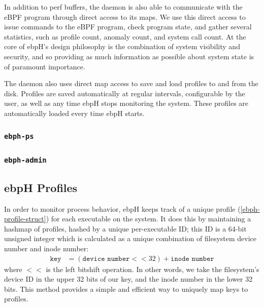 \documentclass[
  12pt]{findlay}
\begin{document}

In addition to perf buffers, the daemon is also able to communicate with
the eBPF program through direct access to its maps. We use this direct
access to issue commands to the eBPF program, check program state, and
gather several statistics, such as profile count, anomaly count, and
system call count. At the core of ebpH's design philosophy is the
combination of system visibility and security, and so providing as much
information as possible about system state is of paramount importance.

The daemon also uses direct map access to save and load profiles to and
from the disk. Profiles are saved automatically at regular intervals,
configurable by the user, as well as any time ebpH stops monitoring the
system. These profiles are automatically loaded every time ebpH starts.

\hypertarget{ebph-ps}{%
\subsubsection{\texorpdfstring{\texttt{ebph-ps}}{ebph-ps}}\label{ebph-ps}}

\hypertarget{ebph-admin}{%
\subsubsection{\texorpdfstring{\texttt{ebph-admin}}{ebph-admin}}\label{ebph-admin}}

\hypertarget{ebph-profiles}{%
\subsection{ebpH Profiles}\label{ebph-profiles}}

\label{ebph_profiles}

In order to monitor process behavior, ebpH keeps track of a unique
profile (\autoref{ebph-profile-struct}) for each executable on the
system. It does this by maintaining a hashmap of profiles, hashed by a
unique per-executable ID; this ID is a 64-bit unsigned integer which is
calculated as a unique combination of filesystem device number and inode
number: \begin{align*}
\texttt{key} &= (\texttt{device number} << 32) + \texttt{inode number}
\end{align*} where \(<<\) is the left bitshift operation. In other
words, we take the filesystem's device ID in the upper 32 bits of our
key, and the inode number in the lower 32 bits. This method provides a
simple and efficient way to uniquely map keys to profiles.
\end{document}
